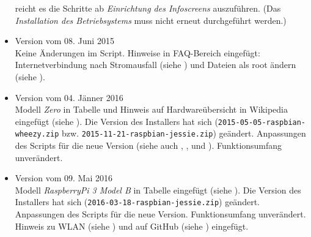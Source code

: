 \begin{itemize}
{		reicht es die Schritte ab  \textit{Einrichtung des Infoscreens} auszuführen.
		(Das  \textit{Installation des Betriebsystems} muss nicht erneut durchgeführt werden.)
		}
	\item {Version vom 08. Juni 2015\\ Keine Änderungen im Script.
		Hinweise in FAQ-Bereich eingefügt: Internetverbindung nach Stromausfall (siehe ) und Dateien als root ändern (siehe ).
 		}
	\item {Version vom 04. Jänner 2016\\ 
		Modell \textit{Zero} in Tabelle und Hinweis auf Hardwareübersicht in Wikipedia eingefügt (siehe ).
		Die Version des Installers hat sich (\lstinline|2015-05-05-raspbian-wheezy.zip| bzw. \lstinline|2015-11-21-raspbian-jessie.zip|) geändert. 
		Anpassungen des Scripts für die neue Version (siehe auch , ,  und ).
		Funktionsumfang unverändert.
 		}
	\item {Version vom 09. Mai 2016\\ 
		Modell \textit{RaspberryPi 3 Model B} in Tabelle eingefügt (siehe ).
		Die Version des Installers hat sich (\lstinline|2016-03-18-raspbian-jessie.zip|) geändert. 
		Anpassungen des Scripts für die neue Version.
		Funktionsumfang unverändert.
		Hinweis zu WLAN (siehe ) und auf GitHub (siehe ) eingefügt.
 		}
\end{itemize}


